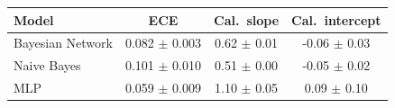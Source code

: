 \begin{tabular}{lccc}
\toprule
Model & ECE & Cal.\ slope & Cal.\ intercept \\
\midrule
Bayesian Network & 0.082 $\pm$ 0.003 & 0.62 $\pm$ 0.01 & -0.06 $\pm$ 0.03 \\
Naive Bayes & 0.101 $\pm$ 0.010 & 0.51 $\pm$ 0.00 & -0.05 $\pm$ 0.02 \\
MLP & 0.059 $\pm$ 0.009 & 1.10 $\pm$ 0.05 & 0.09 $\pm$ 0.10 \\
\bottomrule
\end{tabular}
